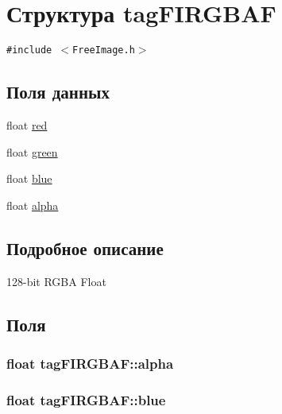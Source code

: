 \hypertarget{structtag_f_i_r_g_b_a_f}{
\section{Структура tagFIRGBAF}
\label{structtag_f_i_r_g_b_a_f}
}
{\tt \#include $<$FreeImage.h$>$}

\subsection*{Поля данных}
\begin{CompactItemize}
\item 
float \hyperlink{structtag_f_i_r_g_b_a_f_59e5260e2f6e013661bc5d4775b18d9e}{red}
\item 
float \hyperlink{structtag_f_i_r_g_b_a_f_c4e284e0711fdba31b624cee92d85e2b}{green}
\item 
float \hyperlink{structtag_f_i_r_g_b_a_f_9c2e5ec45c4c33518fd4765f5fd04b01}{blue}
\item 
float \hyperlink{structtag_f_i_r_g_b_a_f_59da6fdc089e6ad1f8b2be601815f5cb}{alpha}
\end{CompactItemize}


\subsection{Подробное описание}
128-bit RGBA Float 

\subsection{Поля}
\hypertarget{structtag_f_i_r_g_b_a_f_59da6fdc089e6ad1f8b2be601815f5cb}{
\subsubsection[{alpha}]{\setlength{\rightskip}{0pt plus 5cm}float {\bf tagFIRGBAF::alpha}}}
\label{structtag_f_i_r_g_b_a_f_59da6fdc089e6ad1f8b2be601815f5cb}


\hypertarget{structtag_f_i_r_g_b_a_f_9c2e5ec45c4c33518fd4765f5fd04b01}{
\subsubsection[{blue}]{\setlength{\rightskip}{0pt plus 5cm}float {\bf tagFIRGBAF::blue}}}
\label{structtag_f_i_r_g_b_a_f_9c2e5ec45c4c33518fd4765f5fd04b01}


